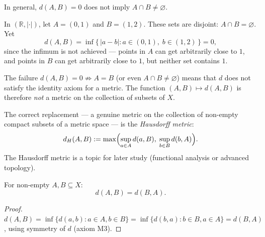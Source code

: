 
\begin{proposition}[$d(A,B) = 0$ does not imply intersection]
\label{prop:dist-sets-not-metric}
In general, $d(A, B) = 0$ does not imply $A \cap B \neq \varnothing$.
\end{proposition}

\begin{example}
\label{ex:dist-sets-zero-disjoint}
In $(\mathbb{R}, |\cdot|)$, let $A = (0,1)$ and $B = (1,2)$.
These sets are disjoint: $A \cap B = \varnothing$.
Yet
\[
d(A, B) = \inf\{\, |a - b| : a \in (0,1),\; b \in (1,2) \,\} = 0,
\]
since the infimum is not achieved --- points in $A$ can get arbitrarily
close to $1$, and points in $B$ can get arbitrarily close to $1$,
but neither set contains $1$.
\end{example}

\begin{remark*}
The failure $d(A,B) = 0 \not\Rightarrow A = B$ (or even $A \cap B \neq \varnothing$)
means that $d$ does not satisfy the identity axiom for a metric.
The function $(A,B) \mapsto d(A,B)$ is therefore \emph{not} a metric on
the collection of subsets of $X$.

The correct replacement --- a genuine metric on the collection of non-empty
compact subsets of a metric space --- is the \emph{Hausdorff metric}:
\[
d_H(A, B)
:= \max\Bigl(
  \sup_{a \in A} d(a, B),\;
  \sup_{b \in B} d(b, A)
\Bigr).
\]
The Hausdorff metric is a topic for later study (functional analysis or
advanced topology).
\end{remark*}


\begin{proposition}
\label{prop:dist-sets-symmetric}
For non-empty $A, B \subseteq X$:
\[
d(A, B) = d(B, A).
\]
\end{proposition}

\begin{proof}
$d(A,B) = \inf\{d(a,b) : a \in A, b \in B\}
= \inf\{d(b,a) : b \in B, a \in A\}
= d(B,A)$,
using symmetry of $d$ (axiom M3).
\end{proof}


